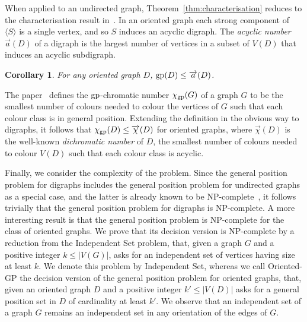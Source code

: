 \documentclass[a4paper,12pt]{article}
\newtheorem{corollary}[theorem]{Corollary}
\theoremstyle{definition}
\newcommand{\IS}{{\sc Independent Set}\xspace}
\newcommand{\GP}{{\sc Oriented-GP}\xspace}
\newcommand{\gp}{{\rm gp}}
\begin{document}
	When applied to an undirected graph, Theorem~\ref{thm:characterisation} reduces to the characterisation result in~\cite{AnaChaChaKlaTho}. In an oriented graph each strong component of $\langle S\rangle$ is a single vertex, and so $S$ induces an acyclic digraph. The \emph{acyclic number} $\overrightarrow{a}(D)$ of a digraph is the largest number of vertices in a subset of $V(D)$ that induces an acyclic subdigraph. 
	
	\begin{corollary}
		For any oriented graph $D$, $\gp (D) \leq \overrightarrow{a}(D)$.
	\end{corollary}
	The paper~\cite{ChaDiSreeThoTui2024+} defines the $\gp $-chromatic number $\chi _{\gp }(G)$ of a graph $G$ to be the smallest number of colours needed to colour the vertices of $G$ such that each colour class is in general position. Extending the definition in the obvious way to digraphs, it follows that $\chi _{\gp }(D) \leq \overrightarrow{\chi } (D)$ for oriented graphs, where $\overrightarrow{\chi } (D)$ is the well-known \emph{dichromatic number} of $D$, the smallest number of colours needed to colour $V(D)$ such that each colour class is acyclic. 
	
	Finally, we consider the complexity of the problem. Since the general position problem for digraphs includes the general position problem for undirected graphs as a special case, and the latter is already known to be NP-complete~\cite{ref9}, it follows trivially that the general position problem for digraphs is NP-complete. A more interesting result is that the general position problem is NP-complete for the class of oriented graphs. We prove that its decision version is NP-complete by a reduction from the Independent Set problem, that, given a graph $G$ and a positive integer $k\leq |V(G)|$, asks for an independent set of vertices having size at least $k$. We denote this problem by \IS, whereas we call \GP the decision version of the general position problem for oriented graphs, that, given an oriented graph $D$ and a positive integer $k'\leq |V(D)|$ asks for a general position set in $D$ of cardinality at least $k'$. We observe that an independent set of a graph $G$ remains an independent set in any orientation of the edges of $G$. 
	
\end{document}

